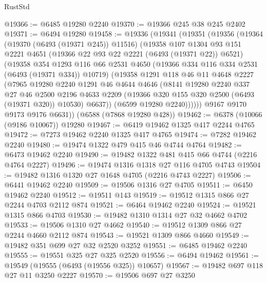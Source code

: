 \begin{lexlean}{RustStd}
\begin{coremodule}
@19366 := @6485 @19280 @2240
@19370 := @19366 @245 @38 @245 @2402
@19371 := @6494 @19280
@19458 := @19336
    (@19341
      (@19351
        (@19356
          (@19364
            (@19370 (@6493 (@19371 @245)) @11516)
            (@19358
              @107
              @1304
              @93
              @151
              @2221
              @4651
              (@19366 @22 @93 @22 @2221 (@6493 (@19371 @22)) @6521)
              (@19358
                @354
                @1293
                @116
                @66
                @2531
                @4650
                (@19366 @334 @116 @334 @2531 (@6493 (@19371 @334)) @10719)
                (@19358
                  @1291
                  @118
                  @46
                  @11
                  @4648
                  @2227
                  (@7965
                    @19280
                    @2240
                    @1291
                    @46
                    @4644
                    @4646
                    (@8141
                      @19280
                      @2240
                      @337
                      @27
                      @46
                      @2500
                      @2196
                      @4633
                      @2209
                      (@19366 @320 @155 @320 @2500 (@6493 (@19371 @320)) @10530)
                      @6637))
                  (@6599 @19280 @2240))))))
        @9167
        @9170
        @9173
        @9176
        @6631))
    (@6588 (@7868 @19280 @428))
@19462 := @6378 (@10066 (@9186 @10067)) @19280
@19467 := @6419 @19462 @1325 @417 @2244 @4765
@19472 := @7273 @19462 @2240 @1325 @417 @4765
@19474 := @7282 @19462 @2240
@19480 := @19474 @1322 @479 @415 @46 @4744 @4764
@19482 := @6473 @19462 @2240
@19490 := @19482 @1322 @481 @415 @66 @4744 (@2216 @4764 @2227)
@19496 := @19474 @1316 @1318 @27 @116 @4705 @4743
@19504 := @19482 @1316 @1320 @27 @1648 @4705 (@2216 @4743 @2227)
@19506 := @6441 @19462 @2240
@19509 := @19506 @1316 @27 @4705
@19511 := @6450 @19462 @2240
@19512 := @19511 @143
@19519 := @19512 @1315 @866 @27 @2244 @4703 @2112 @874
@19521 := @6464 @19462 @2240
@19524 := @19521 @1315 @866 @4703
@19530 := @19482 @1310 @1314 @27 @32 @4662 @4702
@19533 := @19506 @1310 @27 @4662
@19540 := @19512 @1309 @866 @27 @2244 @4660 @2112 @874
@19543 := @19521 @1309 @866 @4660
@19549 := @19482 @351 @699 @27 @32 @2520 @3252
@19551 := @6485 @19462 @2240
@19555 := @19551 @325 @27 @325 @2520
@19556 := @6494 @19462
@19561 := @19549 (@19555 (@6493 (@19556 @325)) @10657)
@19567 := @19482 @697 @118 @27 @11 @3250 @2227
@19570 := @19506 @697 @27 @3250

\end{coremodule}
\end{lexlean}
